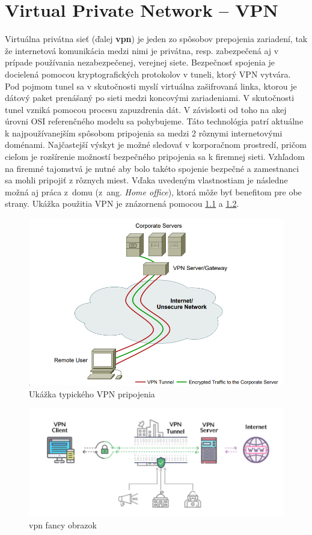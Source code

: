 
\chapter{Virtual Private Network -- VPN}\label{1}
Virtuálna privátna sieť (ďalej \textbf{\acrshort{vpn}}) je jeden zo spôsobov prepojenia zariadení, tak že internetová komunikácia medzi nimi je privátna, resp. zabezpečená aj v prípade používania nezabezpečenej, verejnej siete. Bezpečnosť spojenia je docielená pomocou kryptografických protokolov v tuneli, ktorý VPN vytvára. Pod pojmom tunel sa v skutočnosti myslí virtuálna zašifrovaná linka, ktorou je dátový paket prenášaný po sieti medzi koncovými zariadeniami. V skutočnosti tunel vzniká pomocou procesu zapuzdrenia dát. V závislosti od toho na akej úrovni OSI referenčného modelu sa pohybujeme. 
Táto technológia patrí aktuálne k najpoužívanejším spôsobom pripojenia sa medzi 2 rôznymi internetovými doménami. Najčastejší výskyt je možné sledovať v korporačnom prostredí, pričom cieľom je rozšírenie možností bezpečného pripojenia sa k firemnej sieti. Vzhľadom na firemné tajomstvá je nutné aby bolo takéto spojenie bezpečné a zamestnanci sa mohli pripojiť z rôznych miest. Vďaka uvedeným vlastnostiam je následne možná aj práca z~domu (z~ang. \textit{Home office}), ktorá môže byť benefitom pre obe strany. Ukážka použitia VPN je znázornená pomocou \ref{vpndemo} a \ref{vpnfancy}. 

\begin{figure}[!h]
	\centering
	\includegraphics[width=.8\textwidth]{figures/VPNdemo}
	\caption{Ukážka typického VPN pripojenia}
	\label{vpndemo}
\end{figure}
\begin{figure}
	\centering
	\includegraphics[width=0.7\linewidth]{figures/vpn_fancy}
	\caption{vpn fancy obrazok}
	\label{vpnfancy}
\end{figure}

